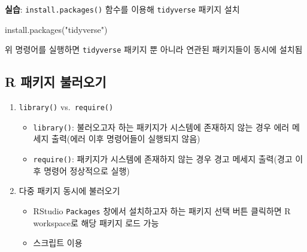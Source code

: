 \documentclass[
  11pt,
]{krantz}
\makeatletter
\newenvironment{Shaded}{\begin{snugshade}}{\end{snugshade}}
\newcommand{\FunctionTok}[1]{\textcolor[rgb]{0,0,0}{#1}}
\newcommand{\NormalTok}[1]{#1}
\newcommand{\StringTok}[1]{\textcolor[rgb]{0.5,0.5,0.5}{#1}}
\providecommand{\tightlist}{%
  \setlength{\itemsep}{0pt}\setlength{\parskip}{0pt}}
\newenvironment{kframe}{%
\medskip{}
\setlength{\fboxsep}{.8em}
 \def\at@end@of@kframe{}%
 \ifinner\ifhmode%
  \def\at@end@of@kframe{\end{minipage}}%
  \begin{minipage}{\columnwidth}%
 \fi\fi%
 \def\FrameCommand##1{\hskip\@totalleftmargin \hskip-\fboxsep
 \colorbox{shadecolor}{##1}\hskip-\fboxsep
     \hskip-\linewidth \hskip-\@totalleftmargin \hskip\columnwidth}%
 \MakeFramed {\advance\hsize-\width
   \@totalleftmargin\z@ \linewidth\hsize
   \@setminipage}}%
 {\par\unskip\endMakeFramed%
 \at@end@of@kframe}
\newenvironment{rmdblock}[1]
  {
  \begin{itemize}
  \renewcommand{\labelitemi}{
    \raisebox{-.7\height}[0pt][0pt]{
      {\setkeys{Gin}{width=3em,keepaspectratio}\texttt{[image: images/\#1]}}
    }
  }
  \setlength{\fboxsep}{1em}
  \begin{kframe}
  \item
  }
  {
  \end{kframe}
  \end{itemize}
  }
\newenvironment{rmdimportant}
  {\begin{rmdblock}{important}}
  {\end{rmdblock}}
\renewenvironment{quote}{\begin{kframe}}{\end{kframe}}
\makeatother
\begin{document}
\footnotesize

\begin{rmdimportant}
\textbf{실습}: \texttt{install.packages()} 함수를 이용해 \texttt{tidyverse} 패키지 설치
\end{rmdimportant}

\normalsize

\footnotesize

\begin{Shaded}
\begin{Highlighting}[]
\FunctionTok{install.packages}\NormalTok{(}\StringTok{"tidyverse"}\NormalTok{)}
\end{Highlighting}
\end{Shaded}

\normalsize

\begin{quote}
위 명령어를 실행하면 \texttt{tidyverse} 패키지 뿐 아니라 연관된 패키지들이 동시에 설치됨
\end{quote}

\hypertarget{r-package-load}{%
\subsection{R 패키지 불러오기}\label{r-package-load}}

\begin{enumerate}
\def\labelenumi{\arabic{enumi}.}
\tightlist
\item
  \texttt{library()} vs.~\texttt{require()}

  \begin{itemize}
  \tightlist
  \item
    \texttt{library()}: 불러오고자 하는 패키지가 시스템에 존재하지 않는 경우 에러 메세지 출력(에러 이후 명령어들이 실행되지 않음)
  \item
    \texttt{require()}: 패키지가 시스템에 존재하지 않는 경우 경고 메세지 출력(경고 이후 명령어 정상적으로 실행)
  \end{itemize}
\item
  다중 패키지 동시에 불러오기

  \begin{itemize}
  \tightlist
  \item
    RStudio \texttt{Packages} 창에서 설치하고자 하는 패키지 선택 버튼 클릭하면 R workspace로 해당 패키지 로드 가능
  \item
    스크립트 이용
  \end{itemize}
\end{enumerate}
\end{document}
